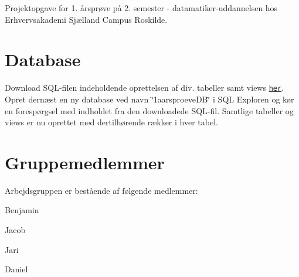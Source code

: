 Projektopgave for 1. årsprøve på 2. semester -\/ datamatiker-\/uddannelsen hos Erhvervsakademi Sjælland Campus Roskilde.

\section*{Database}

Download S\+Q\+L-\/filen indeholdende oprettelsen af div. tabeller samt views \href{1aarsproeve/1aarsproeve/database.sql}{\tt her}. Opret dernæst en ny database ved navn \char`\"{}1aarsproeve\+D\+B\char`\"{} i S\+Q\+L Exploren og kør en forespørgsel med indholdet fra den downloadede S\+Q\+L-\/fil. Samtlige tabeller og views er nu oprettet med dertilhørende rækker i hver tabel.

\section*{Gruppemedlemmer}

Arbejdsgruppen er bestående af følgende medlemmer\+:
\begin{DoxyItemize}
\item Benjamin
\item Jacob
\item Jari
\item Daniel 
\end{DoxyItemize}